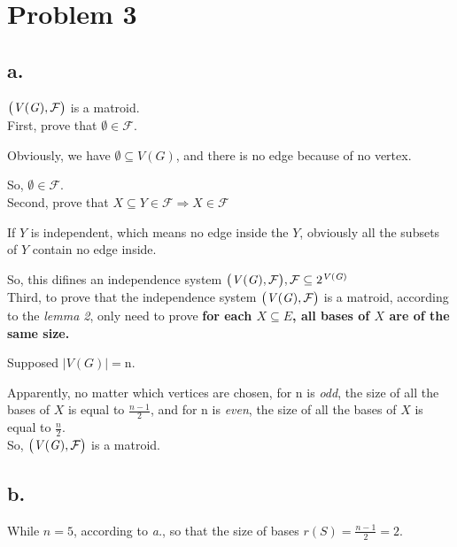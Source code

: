 \documentclass{article}
\begin{document}
\section*{Problem 3}{
    \subsection*{a.}{
        \(\big{(}\mathit{V(G)},\mathcal{F}\big{)}\) is a matroid.\\

        First, prove that \(\emptyset \in \mathcal{F}\).

        Obviously, we have \(\emptyset \subseteq \mathit{V(G)}\), and there is no edge because of no vertex. 

        So, \(\emptyset \in \mathcal{F}\).\\

        Second, prove that \(\mathit{X} \subseteq \mathit{Y} \in \mathcal{F} \Rightarrow \mathit{X} \in \mathcal{F}\)

        If \(\mathit{Y}\) is independent, which means no edge inside the \(\mathit{Y}\), obviously all the subsets of \(\mathit{Y}\) contain no edge inside.

        So, this difines an independence system \(\big{(}\mathit{V(G)},\mathcal{F}\big{)}, \mathcal{F} \subseteq \mathrm{2}^{\mathit{V(G)}}\)\\

        Third, to prove that the independence system \(\big{(}\mathit{V(G)},\mathcal{F}\big{)}\) is a matroid, according to the \textit{lemma 2}, only need to prove \textbf{for each \(\mathit{X} \subseteq \mathit{E}\), all bases of \(\mathit{X}\) are of the same size.}

        Supposed \(\lvert \mathit{V(G)} \rvert = \mathrm{n}\). 

        Apparently, no matter which vertices are chosen, for \(\mathrm{n}\) is \textit{odd}, the size of all the bases of \(\mathit{X}\) is equal to \(\frac{\mathit{n}-\mathrm{1}}{\mathrm{2}}\), and for \(\mathrm{n}\) is \textit{even}, the size of all the bases of \(\mathit{X}\) is equal to \(\frac{\mathit{n}}{\mathrm{2}}\).\\

        So, \(\big{(}\mathit{V(G)},\mathcal{F}\big{)}\) is a matroid.
    }
    \subsection*{b.}{
        While \(\mathit{n} = \mathrm{5}\), according to \textit{a.}, so that the size of bases \(\mathit{r(S)} = \frac{\mathit{n}-\mathrm{1}}{\mathrm{2}}=\mathrm{2}\).

}}
\end{document}
